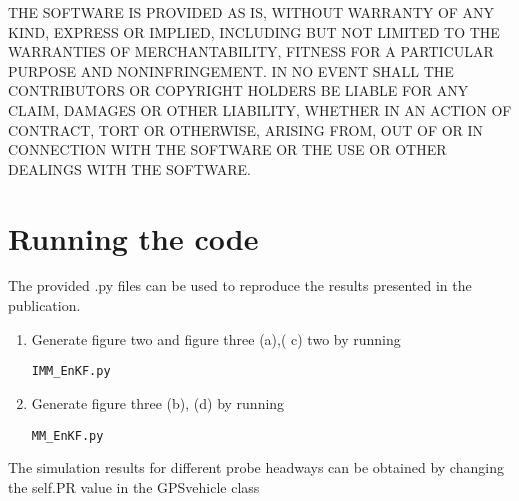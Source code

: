 \documentclass[english]{article}
\begin{document}
THE SOFTWARE IS PROVIDED \textquotedbl{}AS IS\textquotedbl{}, WITHOUT
WARRANTY OF ANY KIND, EXPRESS OR IMPLIED, INCLUDING BUT NOT LIMITED
TO THE WARRANTIES OF MERCHANTABILITY, FITNESS FOR A PARTICULAR PURPOSE
AND NONINFRINGEMENT. IN NO EVENT SHALL THE CONTRIBUTORS OR COPYRIGHT
HOLDERS BE LIABLE FOR ANY CLAIM, DAMAGES OR OTHER LIABILITY, WHETHER
IN AN ACTION OF CONTRACT, TORT OR OTHERWISE, ARISING FROM, OUT OF
OR IN CONNECTION WITH THE SOFTWARE OR THE USE OR OTHER DEALINGS WITH
THE SOFTWARE.





\section{Running the code}
The provided .py files can be used to reproduce the results presented in the publication.
\begin{enumerate}
\item Generate figure two and figure three (a),( c) two by running
\begin{verbatim}IMM_EnKF.py\end{verbatim}
 \item Generate figure three (b), (d) by running
 \begin{verbatim}MM_EnKF.py\end{verbatim}
\end{enumerate}
The simulation results for different probe headways can be obtained by changing the self.PR value in the GPSvehicle class
\end{document}
